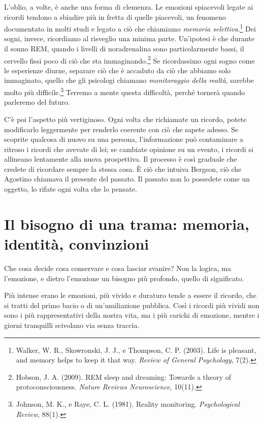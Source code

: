 L'oblio, a volte, è anche una forma di clemenza. Le emozioni spiacevoli legate ai ricordi tendono a sbiadire più in fretta di quelle piacevoli, un fenomeno documentato in molti studi e legato a ciò che chiamiamo \textit{memoria selettiva}.\footnote{Walker, W. R., Skowronski, J. J., e Thompson, C. P. (2003). Life is pleasant, and memory helps to keep it that way. \textit{Review of General Psychology}, 7(2).} Dei sogni, invece, ricordiamo al risveglio una minima parte. Un'ipotesi è che durante il sonno REM, quando i livelli di noradrenalina sono particolarmente bassi, il cervello fissi poco di ciò che sta immaginando.\footnote{Hobson, J. A. (2009). REM sleep and dreaming: Towards a theory of protoconsciousness. \textit{Nature Reviews Neuroscience}, 10(11).} Se ricordassimo ogni sogno come le esperienze diurne, separare ciò che è accaduto da ciò che abbiamo solo immaginato, quello che gli psicologi chiamano \textit{monitoraggio della realtà}, sarebbe molto più difficile.\footnote{Johnson, M. K., e Raye, C. L. (1981). Reality monitoring. \textit{Psychological Review}, 88(1).} Terremo a mente questa difficoltà, perché tornerà quando parleremo del futuro.

C'è poi l'aspetto più vertiginoso. Ogni volta che richiamate un ricordo, potete modificarlo leggermente per renderlo coerente con ciò che sapete adesso. Se scoprite qualcosa di nuovo su una persona, l'informazione può contaminare a ritroso i ricordi che avevate di lei; se cambiate opinione su un evento, i ricordi si allineano lentamente alla nuova prospettiva. Il processo è così graduale che credete di ricordare sempre la stessa cosa. È ciò che intuiva Bergson, ciò che Agostino chiamava il presente del passato. Il passato non lo possedete come un oggetto, lo rifate ogni volta che lo pensate.

\section{Il bisogno di una trama: memoria, identità, convinzioni}

Che cosa decide cosa conservare e cosa lasciar svanire? Non la logica, ma l'emozione, e dietro l'emozione un bisogno più profondo, quello di significato.

Più intense erano le emozioni, più vivido e duraturo tende a essere il ricordo, che si tratti del primo bacio o di un'umiliazione pubblica. Così i ricordi più vividi non sono i più rappresentativi della nostra vita, ma i più carichi di emozione, mentre i giorni tranquilli scivolano via senza traccia.

